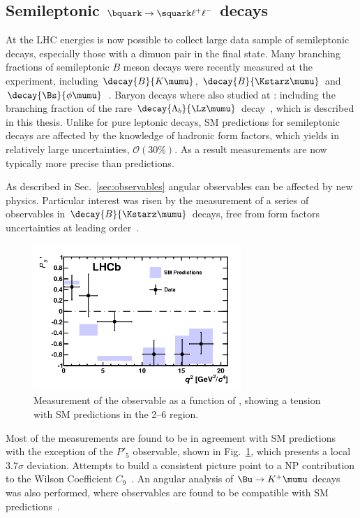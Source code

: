 \subsection{Semileptonic $\bquark\to\squark\ell^+\ell^-$ decays}

At the LHC energies is now possible to collect large data sample of semileptonic 
decays, especially those with a dimuon pair in the final state.
Many branching fractions of semileptonic $B$ meson decays were recently measured at
the \lhcb experiment, including $\decay{B}{K\mumu}$, $\decay{B}{\Kstarz\mumu}$
and $\decay{\Bs}{\phi\mumu}$~\cite{LHCB-PAPER-2013-017,LHCB-PAPER-2013-019,Aaij:2014pli}. 
Baryon decays where also studied at \lhcb: including the branching fraction of
the rare $\decay{\Lambda_b}{\Lz\mumu}$ decay~\cite{Aaij:2015xza}, which is described in this thesis.
Unlike for pure leptonic decays, SM predictions for semileptonic decays are affected by the
knowledge of hadronic form factors, which yields in relatively large uncertainties,
$\mathcal{O}(30\%)$. As a result measurements are now typically more precise than predictions.

As described in Sec.~\ref{sec:observables} angular observables can be affected by 
new physics. Particular interest was risen by the measurement of a series of observables in
$\decay{B}{\Kstarz\mumu}$ decays, free from form factors uncertainties at leading order~\cite{LHCB-PAPER-2013-037}.
%
\begin{figure}[h!]
\centering
\includegraphics[width=0.7\textwidth]{Introduction/figs/P5prime.png}
\caption{Measurement of the observable as a function of \qsq, showing a tension with
SM predictions in the 2--6 \gevgevcccc region.}
\label{fig:P5prime}
\end{figure}
%
Most of the measurements are found to be in agreement with SM predictions
with the exception of the $P'_{5}$ observable, shown in Fig.~\ref{fig:P5prime}, which presents
a local $3.7\sigma$ deviation. Attempts to build a consistent picture point to a NP contribution
to the Wilson Coefficient $C_9$~\cite{Descotes-Genon:2013wba}.
An angular analysis of $\Bu\to K^+\mumu$ decays was also performed, where observables
are found to be compatible with SM predictions~\cite{LHCB-PAPER-2014-007}.

